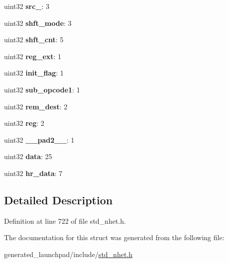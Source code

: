 \begin{DoxyCompactItemize}
\mbox{\label{structXOR__format_a8cd085409b82cda87e1fbe0fec64c950}} 
uint32 {\bfseries src\+\_}\+: 3
\item 
\mbox{\label{structXOR__format_a6f29640163141c3752f62c0794085cf9}} 
uint32 {\bfseries shft\+\_\+mode}\+: 3
\item 
\mbox{\label{structXOR__format_a82a653fdf55dd8baa35598829e05774c}} 
uint32 {\bfseries shft\+\_\+cnt}\+: 5
\item 
\mbox{\label{structXOR__format_a79022c41a1d2adf7a12d415e75efcc0e}} 
uint32 {\bfseries reg\+\_\+ext}\+: 1
\item 
\mbox{\label{structXOR__format_a59be5712095b6275e201f4481427e9d6}} 
uint32 {\bfseries init\+\_\+flag}\+: 1
\item 
\mbox{\label{structXOR__format_a9882df22895e8ccca0bc14846664bf01}} 
uint32 {\bfseries sub\+\_\+opcode1}\+: 1
\item 
\mbox{\label{structXOR__format_abeb9e770f6e0cc7586f5d46091bbc691}} 
uint32 {\bfseries rem\+\_\+dest}\+: 2
\item 
\mbox{\label{structXOR__format_af41c40178059eed8590d2f4c4b3f0907}} 
uint32 {\bfseries reg}\+: 2
\item 
\mbox{\label{structXOR__format_ad109094432ff6ac4c6f9556538322b25}} 
uint32 {\bfseries \+\_\+\+\_\+pad2\+\_\+\+\_\+}\+: 1
\item 
\mbox{\label{structXOR__format_a98aad61d80ed5494daa197afa57b11cb}} 
uint32 {\bfseries data}\+: 25
\item 
\mbox{\label{structXOR__format_a4dc791ecc6591a307a86021a11d0085c}} 
uint32 {\bfseries hr\+\_\+data}\+: 7
\end{DoxyCompactItemize}


\subsection{Detailed Description}


Definition at line 722 of file std\+\_\+nhet.\+h.



The documentation for this struct was generated from the following file\+:\begin{DoxyCompactItemize}
\item 
generated\+\_\+launchpad/include/\mbox{\hyperlink{std__nhet_8h}{std\+\_\+nhet.\+h}}\end{DoxyCompactItemize}
